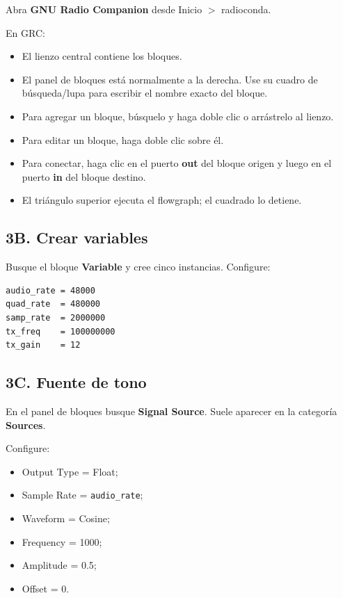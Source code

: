 Abra \textbf{GNU Radio Companion} desde Inicio $>$ radioconda.

En GRC:

\begin{itemize}
    \item El lienzo central contiene los bloques.
    \item El panel de bloques está normalmente a la derecha. Use su cuadro de búsqueda/lupa para escribir el nombre exacto del bloque.
    \item Para agregar un bloque, búsquelo y haga doble clic o arrástrelo al lienzo.
    \item Para editar un bloque, haga doble clic sobre él.
    \item Para conectar, haga clic en el puerto \textbf{out} del bloque origen y luego en el puerto \textbf{in} del bloque destino.
    \item El triángulo superior ejecuta el flowgraph; el cuadrado lo detiene.
\end{itemize}

\subsection{3B. Crear variables}

Busque el bloque \textbf{Variable} y cree cinco instancias. Configure:

\begin{lstlisting}
audio_rate = 48000
quad_rate  = 480000
samp_rate  = 2000000
tx_freq    = 100000000
tx_gain    = 12
\end{lstlisting}

\subsection{3C. Fuente de tono}

En el panel de bloques busque \textbf{Signal Source}. Suele aparecer en la categoría \textbf{Sources}.

Configure:

\begin{itemize}
    \item Output Type = Float;
    \item Sample Rate = \texttt{audio\_rate};
    \item Waveform = Cosine;
    \item Frequency = 1000;
    \item Amplitude = 0.5;
    \item Offset = 0.
\end{itemize}

